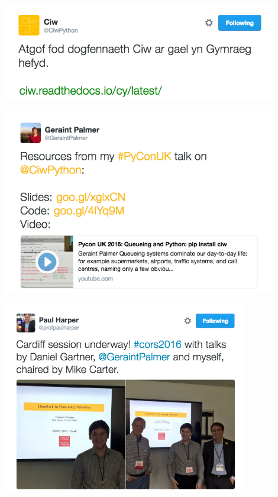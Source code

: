 \documentclass{beamer}
\begin{document}
\begin{frame}
  \begin{center}
  \href{https://twitter.com/CiwPython/status/750697026023747584}{\includegraphics[width=0.9\textwidth]{tweets/cymraeg_docs}}
  \end{center}
\end{frame}
\begin{frame}
  \begin{center}
  \href{https://twitter.com/GeraintPalmer/status/777931024336621568}{\includegraphics[width=0.9\textwidth]{tweets/pyconuk}}
  \end{center}
\end{frame}

\begin{frame}
  \begin{center}
  \href{https://twitter.com/profpaulharper/status/737411211063492608}{\includegraphics[width=0.8\textwidth]{tweets/cors}}
  \end{center}
\end{frame}
\end{document}
